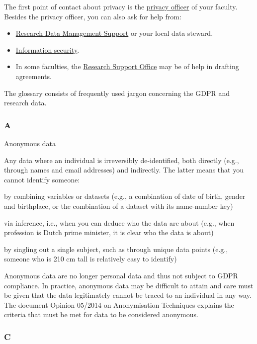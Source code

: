 \documentclass[
]{book}
\providecommand{\tightlist}{%
  \setlength{\itemsep}{0pt}\setlength{\parskip}{0pt}}
\begin{document}
The first point of contact about privacy is the \href{https://intranet.uu.nl/en/knowledgebase/privacyofficers}{privacy officer}
of your faculty. Besides the privacy officer, you can also ask for help from:

\begin{itemize}
\tightlist
\item
  \href{https://www.uu.nl/en/research/research-data-management/contact-us}{Research Data Management Support}
  or your local data steward.
\item
  \href{https://intranet.uu.nl/en/security/information-security-contact-who-are-we}{Information security}.
\item
  In some faculties, the \href{https://intranet.uu.nl/en/knowledgebase/research-support-offices}{Research Support Office}
  may be of help in drafting agreements.
\end{itemize}

The glossary consists of frequently used jargon concerning the GDPR and research data.

\hypertarget{a}{%
\subsubsection{A}\label{a}}

Anonymous data

Any data where an individual is irreversibly de-identified, both directly (e.g., through names and email addresses) and indirectly. The latter means that you cannot identify someone:

by combining variables or datasets (e.g., a combination of date of birth, gender and birthplace, or the combination of a dataset with its name-number key)

via inference, i.e., when you can deduce who the data are about (e.g., when profession is Dutch prime minister, it is clear who the data is about)

by singling out a single subject, such as through unique data points (e.g., someone who is 210 cm tall is relatively easy to identify)

Anonymous data are no longer personal data and thus not subject to GDPR compliance. In practice, anonymous data may be difficult
to attain and care must be given that the data legitimately cannot be traced to an individual in any way. The document
Opinion 05/2014 on Anonymisation Techniques
explains the criteria that must be met for data to be considered anonymous.

\hypertarget{c}{%
\subsubsection{C}\label{c}}
\end{document}

